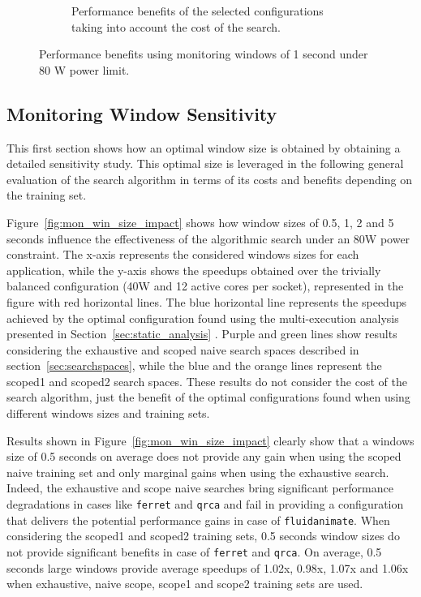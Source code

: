 \begin{figure}[p]
\begin{subfigure}{0.7\columnwidth}
        \caption{Performance benefits of the selected configurations taking into account the cost of the search.}
        \label{fig:dynamic_analysis_cost}%
        \end{subfigure}
        \caption{Performance benefits using monitoring windows of 1 second under 80 W power limit.}
\end{figure}


\subsection{Monitoring Window Sensitivity}
\label{sec:window_size_impact}

This first section shows how an optimal window size is obtained by obtaining a detailed
sensitivity study.  This optimal size is leveraged in the following general evaluation of
the search algorithm in terms of its costs and benefits depending on the training set.


Figure~\ref{fig:mon_win_size_impact} shows how window sizes of 0.5, 1, 2 and 5 seconds
influence the effectiveness of the algorithmic search under an 80W power constraint.  The
x-axis represents the considered windows sizes for each application, while the y-axis
shows the speedups obtained over the trivially balanced configuration (40W and 12 active
cores per socket), represented in the figure with red horizontal lines.  The blue
horizontal line represents the speedups achieved by the optimal configuration found using
the multi-execution analysis presented in Section~\ref{sec:static_analysis} .  Purple and
green lines show results considering the exhaustive and scoped naive search spaces
described in section~\ref{sec:searchspaces}, while the blue and the orange lines represent
the scoped1 and scoped2 search spaces.  These results do not consider the cost of the
search algorithm, just the benefit of the optimal configurations found when using
different windows sizes and training sets.

Results shown in Figure~\ref{fig:mon_win_size_impact} clearly show that a windows size of
0.5 seconds on average does not provide  any gain when using the scoped naive training set
and only marginal gains when using the exhaustive search.  Indeed, the exhaustive and
scope naive searches bring significant performance degradations in cases like
\texttt{ferret} and \texttt{qrca} and fail in providing a configuration that delivers the
potential performance gains in case of \texttt{fluidanimate}.  When considering the
scoped1 and scoped2 training sets, 0.5 seconds window sizes do not provide significant
benefits in case of \texttt{ferret} and \texttt{qrca}.  On average, 0.5 seconds large
windows provide average speedups of 1.02x, 0.98x, 1.07x and 1.06x when exhaustive, naive
scope, scope1 and scope2 training sets are used.   

